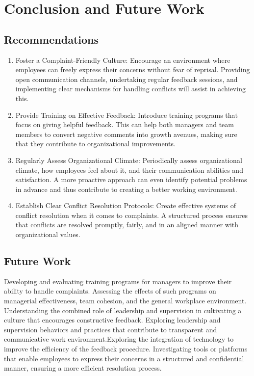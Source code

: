 \documentclass[a4paper,12pt]{article}
\begin{document}
\newpage
\section{Conclusion and Future Work}

\subsection{Recommendations}
\begin{enumerate}
    \item Foster a Complaint-Friendly Culture:
Encourage an environment where employees can freely express their concerns without fear of reprisal. Providing open communication channels, undertaking regular feedback sessions, and implementing clear mechanisms for handling conflicts will assist in achieving this.

    \item Provide Training on Effective Feedback:
Introduce training programs that focus on giving helpful feedback. This can help both managers and team members to convert negative comments into growth avenues, making sure that they contribute to organizational improvements\cite{feedback_importance}.

    \item Regularly Assess Organizational Climate:
Periodically assess organizational climate, how employees feel about it, and their communication abilities and satisfaction. A more proactive approach can even identify potential problems in advance and thus contribute to creating a better working environment.

    \item Establish Clear Conflict Resolution Protocols:
Create effective systems of conflict resolution when it comes to complaints. A structured process ensures that conflicts are resolved promptly, fairly, and in an aligned manner with organizational values\cite{conflict_management}.
\end{enumerate}
\subsection{Future Work}
Developing and evaluating training programs for managers to improve their ability to handle complaints. Assessing the effects of such programs on managerial effectiveness, team cohesion, and the general workplace environment\cite{feedback_importance}.
Understanding the combined role of leadership and supervision in cultivating a culture that encourages constructive feedback. Exploring leadership and supervision behaviors and practices that contribute to transparent and communicative work environment\cite{workplace_emotions}.Exploring the integration of technology to improve the efficiency of the feedback procedure. Investigating tools or platforms that enable employees to express their concerns in a structured and confidential manner, ensuring a more efficient resolution process.
\end{document}
